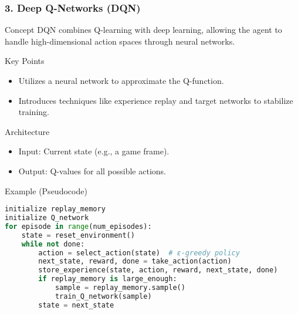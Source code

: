 \documentclass[aspectratio=169]{beamer}
\begin{document}
\begin{frame}[fragile]
    \frametitle{3. Deep Q-Networks (DQN)}
    
    \begin{block}{Concept}
        DQN combines Q-learning with deep learning, allowing the agent to handle high-dimensional action spaces through neural networks.
    \end{block}
    
    \begin{block}{Key Points}
        \begin{itemize}
            \item Utilizes a neural network to approximate the Q-function.
            \item Introduces techniques like experience replay and target networks to stabilize training.
        \end{itemize}
    \end{block}
    
    \begin{block}{Architecture}
        \begin{itemize}
            \item Input: Current state (e.g., a game frame).
            \item Output: Q-values for all possible actions.
        \end{itemize}
    \end{block}
    
    \begin{block}{Example (Pseudocode)}
        \begin{lstlisting}[language=Python]
initialize replay_memory
initialize Q_network
for episode in range(num_episodes):
    state = reset_environment()
    while not done:
        action = select_action(state)  # ε-greedy policy
        next_state, reward, done = take_action(action)
        store_experience(state, action, reward, next_state, done)
        if replay_memory is large_enough:
            sample = replay_memory.sample()
            train_Q_network(sample)
        state = next_state
        \end{lstlisting}
    \end{block}
\end{frame}
\end{document}
